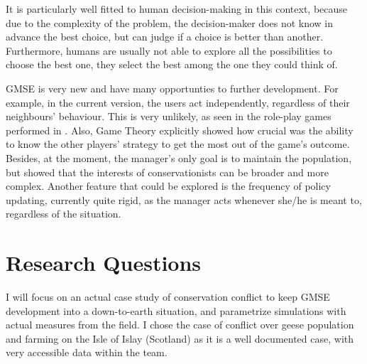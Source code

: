 \documentclass[12pt,a4paper]{article}
\begin{document}
It is particularly well fitted to human decision-making in this context, because due to the complexity of the problem, the decision-maker does not know in advance the best choice, but can judge if a choice is better than another.
Furthermore, humans are usually not able to explore all the possibilities to choose the best one, they select the best among the one they could think of.
%
%

GMSE is very new and have many opportunties to further development.
For example, in the current version, the users act independently, regardless of their neighbours' behaviour.
This is very unlikely, as seen in the role-play games performed in \cite{redpath2018games}.
Also, Game Theory explicitly showed how crucial was the ability to know the other players' strategy to get the most out of the game's outcome.
Besides, at the moment, the manager's only goal is to maintain the population, but \cite{holmes2017understanding} showed that the interests of conservationists can be broader and more complex.
Another feature that could be explored is the frequency of policy updating, currently quite rigid, as the manager acts whenever she/he is meant to, regardless of the situation.

\section{Research Questions}
I will focus on an actual case study of conservation conflict to keep GMSE development into a down-to-earth situation, and parametrize simulations with actual measures from the field.
I chose the case of conflict over geese population and farming on the Isle of Islay (Scotland) as it is a well documented case, with very accessible data within the team.
\end{document}
